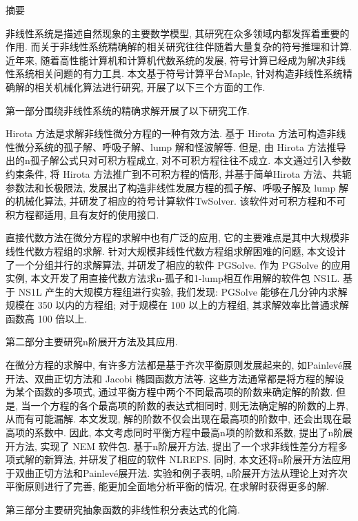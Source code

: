{}
\centerline{\heiti 摘\quad 要}

\linespread{1.4} \bigskip

非线性系统是描述自然现象的主要数学模型, 其研究在众多领域内都发挥着重要的作用. 而关于非线性系统精确解的相关研究往往伴随着大量复杂的符号推理和计算. 近年来, 随着高性能计算机和计算机代数系统的发展, 符号计算已经成为解决非线性系统相关问题的有力工具. 本文基于符号计算平台Maple, 针对构造非线性系统精确解的相关机械化算法进行研究, 开展了以下三个方面的工作. 

第一部分围绕非线性系统的精确求解开展了以下研究工作. 

Hirota 方法是求解非线性微分方程的一种有效方法. 基于 Hirota 方法可构造非线性微分系统的孤子解、呼吸子解、lump 解和怪波解等. 但是, 由 Hirota 方法推导出的n孤子解公式只对可积方程成立, 对不可积方程往往不成立. 本文通过引入参数约束条件, 将 Hirota 方法推广到不可积方程的情形, 并基于简单Hirota 方法、共轭参数法和长极限法, 发展出了构造非线性发展方程的孤子解、呼吸子解及 lump 解的机械化算法, 并研发了相应的符号计算软件TwSolver. 该软件对可积方程和不可积方程都适用, 且有友好的使用接口. 

直接代数方法在微分方程的求解中也有广泛的应用, 它的主要难点是其中大规模非线性代数方程组的求解. 针对大规模非线性代数方程组求解困难的问题, 本文设计了一个分组并行的求解算法, 并研发了相应的软件 PGSolve. 作为 PGSolve 的应用实例, 本文开发了用直接代数方法求n-孤子和1-lump相互作用解的软件包 NS1L. 基于 NS1L 产生的大规模方程组进行实验, 我们发现: PGSolve 能够在几分钟内求解规模在 350 以内的方程组; 对于规模在 100 以上的方程组, 其求解效率比普通求解函数高 100 倍以上. 

第二部分主要研究n阶展开方法及其应用. 

在微分方程的求解中, 有许多方法都是基于齐次平衡原则发展起来的, 如Painlevé展开法、双曲正切方法和 Jacobi 椭圆函数方法等. 这些方法通常都是将方程的解设为某个函数的多项式, 通过平衡方程中两个不同最高项的阶数来确定解的阶数. 但是, 当一个方程的各个最高项的阶数的表达式相同时, 则无法确定解的阶数的上界, 从而有可能漏解. 本文发现, 解的阶数不仅会出现在最高项的阶数中, 还会出现在最高项的系数中. 因此, 本文考虑同时平衡方程中最高n项的阶数和系数, 提出了n阶展开方法, 实现了 NEM 软件包. 基于n阶展开方法, 提出了一个求非线性差分方程多项式解的新算法, 并研发了相应的软件 NLREPS. 同时, 本文还将n阶展开方法应用于双曲正切方法和Painlevé展开法. 实验和例子表明, n阶展开方法从理论上对齐次平衡原则进行了完善, 能更加全面地分析平衡的情况, 在求解时获得更多的解. 

第三部分主要研究抽象函数的非线性积分表达式的化简.

